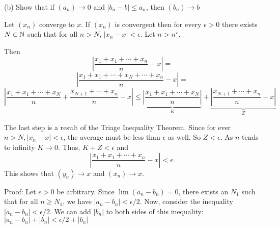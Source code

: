 \documentclass{report}
\begin{document}
\bigskip
(b) Show that if $\left(a_n\right) \rightarrow 0$ and $\left|b_n-b\right| \leq a_n$, then $\left(b_n\right) \rightarrow b$



\bigskip
\begin{myproof}
    
  Let $(x_n)$ converge to $x$. If $(x_n)$ is convergent then for every $\epsilon >0$ there exists $N \in \NN$ such that for all $n > N$, $| x_{n} - x| < \epsilon.$ Let $n > n^\star.$

  Then $$ \left| \frac{x_1 + x_1 +\cdots + x_{n} }{n}  - x\right|= $$$$ \left| \frac{x_1 + x_1 + \cdots + x_{N}+ \cdots + x_{n} }{n}  - x\right|= $$
$$ \left| \frac{x_1 + x_1 + \cdots + x_{N}}{n} + \frac{ x_{N+1}+ \cdots + x_{n} }{n} - x\right| \leq \underbrace{\left| \frac{x_1 + x_1 + \cdots + x_{N}}{n} \right|}_{K}+ \underbrace{ \left|\frac{ x_{N + 1}+ \cdots + x_{n} }{n} - x\right|}_{Z}$$

The last step is a result of the Triage Inequality Theorem. Since for ever $n > N, | x_{n} - x| < \epsilon$, the average must be less than $\epsilon$ as well. So $Z < \epsilon.$ As $n$ tends to infinity $K \rightarrow 0.$  Thus, $ K + Z <\epsilon$ and
$$ \left| \frac{x_1 + x_1 +\cdots + x_{n} }{n}  - x\right|< \epsilon.$$
This shows that $(y_n) \rightarrow x$ and $(x_n) \rightarrow x.$

\bigskip
\end{myproof}



Proof:
Let $\epsilon>0$ be arbitrary. Since $\lim \left(a_n-b_n\right)=0$, there exists an $N_1$ such that for all $n \geq N_1$, we have $\left|a_n-b_n\right|<\epsilon / 2$. Now, consider the inequality $\left|a_n-b_n\right|<\epsilon / 2$. We can add $\left|b_n\right|$ to both sides of this inequality: $\left|a_n-b_n\right|+\left|b_n\right|<\epsilon / 2+\left|b_n\right|$
\end{document}
